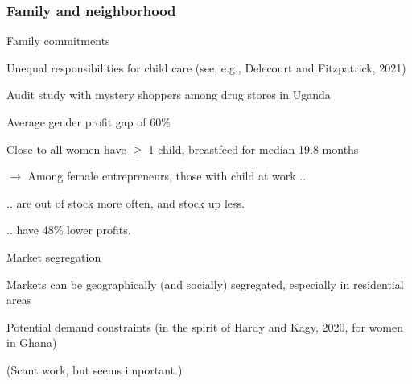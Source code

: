 \documentclass[hideothersubsections, usenames,dvipsnames,11pt]{beamer}
\newenvironment{itemize_2pt}{\itemize\addtolength{\itemsep}{2pt}}{\enditemize}
\begin{document}
\begin{frame}
\frametitle{Family and neighborhood}

Family commitments
\begin{itemize_2pt}
	\item \textcolor{bdf}{Unequal responsibilities for child care} (see, e.g., \textcolor{camel}{Delecourt and Fitzpatrick, 2021})
	\begin{itemize_2pt}
		\item Audit study with mystery shoppers among drug stores in Uganda
		\item Average gender profit gap of 60\%
		\item Close to all women have $\geq$ 1 child, breastfeed for median 19.8 months
		\item[] $\rightarrow$ Among female entrepreneurs, those with child at work ..
		\begin{itemize_2pt}
			\item .. are \textcolor{bdf}{out of stock} more often, and stock up less.
			\item .. have \textcolor{bdf}{48\% lower profits}.
		\end{itemize_2pt}
	\end{itemize_2pt}
\end{itemize_2pt}

\pause
\vspace{1.0em}

Market segregation
\begin{itemize_2pt}
	\item Markets can be geographically (and socially) segregated, especially in residential areas
	\begin{itemize_2pt}
		\item Potential \textcolor{bdf}{demand constraints} (in the spirit of \textcolor{camel}{Hardy and Kagy, 2020}, for women in Ghana)
		\item (Scant work, but seems important.)
	\end{itemize_2pt}
\end{itemize_2pt}
\end{frame}
\end{document}
